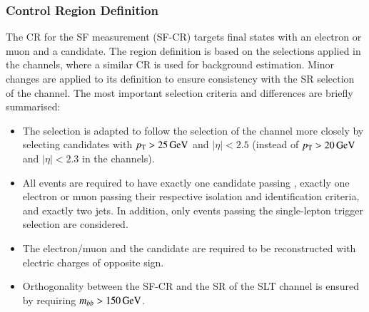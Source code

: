 \subsubsection{Control Region Definition}

The CR for the SF measurement (SF-CR) targets final states with an electron or
muon and a \tauhadvis candidate. The region definition is based on the
selections applied in the \lephad channels, where a similar CR is used for
\faketauhadvis background estimation. Minor changes are applied to its
definition to ensure consistency with the SR selection of the \hadhad
channel. The most important selection criteria and differences are briefly
summarised:
\begin{itemize}

\item The \tauhadvis selection is adapted to follow the selection of the \hadhad
  channel more closely by selecting candidates with $p_{\text{T}} > \SI{25}{\ensuremath{\text{GeV}}}$ and
  $|\eta| < \num{2.5}$ (instead of $\pT > \SI{20}{\GeV}$ and
  $|\eta| < \num{2.3}$ in the \lephad channels).

\item All events are required to have exactly one \tauhadvis candidate passing
  \tauid, exactly one electron or muon passing their respective isolation and
  identification criteria, and exactly two \btagged jets. In addition, only
  events passing the single-lepton trigger selection are considered.

\item The electron/muon and the \tauhadvis candidate are required to be
  reconstructed with electric charges of opposite sign.

\item Orthogonality between the SF-CR and the SR of the \lephad SLT channel is
  ensured by requiring $m_{bb} > \SI{150}{\ensuremath{\text{GeV}}}$.

\end{itemize}


